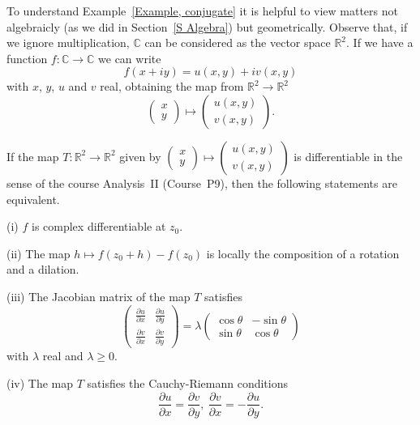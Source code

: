 To understand Example~\ref{Example, conjugate} it is helpful
to view matters not algebraicly (as we did in 
Section~\ref{S Algebra}) but geometrically. Observe
that, if we ignore multiplication,
${\mathbb C}$ can be considered as the vector space
${\mathbb R}^{2}$. If we have a function
$f:{\mathbb C}\rightarrow{\mathbb C}$ we can write
\[f(x+iy)=u(x,y)+iv(x,y)\]
with $x$, $y$, $u$ and $v$ real, obtaining
the map from ${\mathbb R}^{2}\rightarrow{\mathbb R}^{2}$
\[\left(\begin{matrix}x\\y\end{matrix}\right)
\mapsto
\left(\begin{matrix}u(x,y)\\v(x,y)\end{matrix}\right).\]
\begin{theorem} If the map 
$T:{\mathbb R}^{2}\rightarrow{\mathbb R}^{2}$
given by
${\displaystyle
\left(\begin{matrix}x\\y\end{matrix}\right)
\mapsto
\left(\begin{matrix}u(x,y)\\v(x,y)\end{matrix}\right)
}$
is differentiable in the sense of the course Analysis~II
(Course~P9),
then the following statements are equivalent.

(i) $f$ is complex differentiable at $z_{0}$.

(ii) The map $h\mapsto f(z_{0}+h)-f(z_{0})$ is locally
the composition of a rotation and a dilation.

(iii) The Jacobian matrix of the map $T$ satisfies
\[
\left(\begin{matrix}
\frac{\partial u}{\partial x}&\frac{\partial u}{\partial y}\\ 
\frac{\partial v}{\partial x}&\frac{\partial v}{\partial y}
\end{matrix}\right)
=\lambda
\left(\begin{matrix}
\cos\theta&-\sin\theta\\ \sin\theta&\cos\theta
\end{matrix}\right)
\]
with $\lambda$ real and $\lambda\geq 0$.

(iv) The map $T$ satisfies the Cauchy-Riemann conditions
\[
\frac{\partial u}{\partial x}=\frac{\partial v}{\partial y}
,\ \frac{\partial v}{\partial x}=-\frac{\partial u}{\partial y}.
\]
\end{theorem} 

